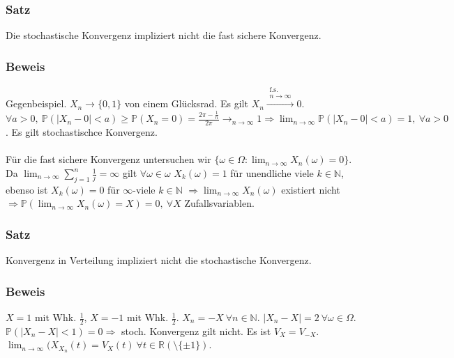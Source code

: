 \subsubsection{Satz}
Die stochastische Konvergenz impliziert nicht die fast sichere Konvergenz.
\subsubsection{Beweis}
Gegenbeispiel. $X_n\to\{0,1\}$ von einem Gl\"ucksrad.
Es gilt $X_n\xrightarrow{\substack{\text{f.s.}\\n\to\infty}}0$. $\forall a>0,\ \mathbb{P}(|X_n-0|<a)\geq\mathbb{P}(X_n=0)=\frac{2\pi-\frac{1}{n}}{2\pi}\to_{n\to\infty}1\Rightarrow\lim_{n\to\infty}\mathbb{P}(|X_n-0|<a)=1,\ \forall a>0$. Es gilt stochastischce Konvergenz.
\\~\\
F\"ur die fast sichere Konvergenz untersuchen wir $\{\omega\in\Omega\colon\lim_{n\to\infty}X_n(\omega)=0\}$. Da $\lim_{n\to\infty}\sum_{j=1}^n\frac{1}{j}=\infty$ gilt $\forall\omega\in\omega$ $X_k(\omega)=1$ f\"ur unendliche viele $k\in\mathbb{N}$, ebenso ist $X_k(\omega)=0$ f\"ur $\infty$-viele $k\in\mathbb{N}$ $\Rightarrow\lim_{n\to\infty}X_n(\omega)$ existiert nicht $\Rightarrow\mathbb{P}(\lim_{n\to\infty}X_n(\omega)=X)=0,\ \forall X$ Zufallsvariablen.
\subsubsection{Satz}
Konvergenz in Verteilung impliziert nicht die stochastische Konvergenz.
\subsubsection{Beweis}
$X=1$ mit Whk. $\frac{1}{2}$, $X=-1$ mit Whk. $\frac{1}{2}$. $X_n=-X\ \forall n\in\mathbb{N}$. $|X_n-X|=2\ \forall\omega\in\Omega$. $\mathbb{P}(|X_n-X|<1)=0\Rightarrow$ stoch. Konvergenz gilt nicht. Es ist $V_X=V_{-X}$. $\lim_{n\to\infty}(X_{X_n}(t)=V_X(t)\ \forall t\in\mathbb{R}(\setminus\{\pm1\})$.
